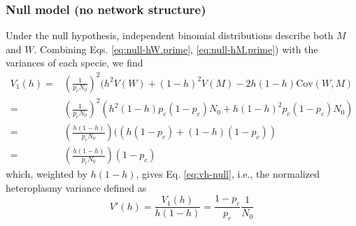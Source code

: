 \documentclass{article}
\begin{document}
\begin{appendices}
\subsubsection*{Null model (no network structure)}\label{app:derivations}
Under the null hypothesis, independent binomial distributions describe both $M$ and $W$. Combining Eqs. \ref{eq:null-hW.prime}, \ref{eq:null-hM.prime}) with the variances of each specie, we find
\begin{equation*}
    \begin{split}
 V_1(h) = & \left(\frac{1}{p_cN_0}\right)^2(h^2V(W)+(1-h)^2V(M)
            -2h(1-h)\mathrm{Cov}(W,M)\\
        = & \left(\frac{1}{p_cN_0}\right)^2(h^2(1-h)p_c(1-p_c)N_0
            +h(1-h)^2p_c(1-p_c)N_0)\\
        = & \left(\frac{h(1-h)}{p_cN_0}\right)((h(1-p_c)+(1-h)(1-p_c))\\
        = & \left(\frac{h(1-h)}{p_cN_0}\right)(1-p_c)
    \end{split}
\end{equation*}
which, weighted by $h(1-h)$, gives Eq. \ref{eq:vh-null}, i.e., the normalized heteroplasmy variance defined as
\begin{equation}\label{eq:app-vh-null}
V'(h)=\frac{V_1(h)}{h(1-h)}=\frac{1-p_c}{p_c}\frac{1}{N_0}
\end{equation}


\end{appendices}
\end{document}

